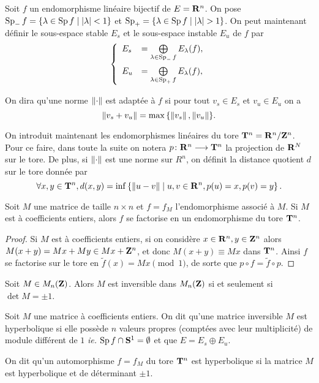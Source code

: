   Soit $f$ un endomorphisme linéaire bijectif de $E = \mathbf R^n$.
  On pose $\operatorname{Sp}_{-}f = \{\lambda \in \operatorname{Sp} f \mid |\lambda| < 1\}$ et $\operatorname{Sp}_{+} = \{\lambda \in \operatorname{Sp}{f} \mid |\lambda| > 1\}$.
  On peut maintenant définir le sous-espace stable $E_s$ et le sous-espace instable $E_u$ de $f$ par
  $$\left\{\begin{array}{ll}
    E_s &= \bigoplus\limits_{\lambda \in \Spe_-{f}} E_{\lambda}(f),\vspace{0.5em} \\
    E_u &= \bigoplus\limits_{\lambda \in \Spe_+{f}} E_{\lambda}(f), \\
  \end{array}\right.$$

  On dira qu'une norme $\left\lVert \cdot\right\rVert$ est adaptée à $f$ si pour tout $v_s \in E_s$ et $v_u \in E_u$ on a
  $$\left\lVert v_s + v_u\right\rVert = \max{\{\left\lVert v_s\right\rVert, \left\lVert v_u\right\rVert\}}.$$

  On introduit maintenant les endomorphismes linéaires du tore $\mathbf T^n = \mathbf R^n / \mathbf Z^n$. Pour ce faire,
  dans toute la suite on notera $p \colon \mathbf R^n \longrightarrow \mathbf T^n$ la projection de $\mathbf R^N$ sur le tore.
  De plus, si $\left\lVert \cdot\right\rVert$ est une norme sur $R^n$, on définit la distance quotient $d$ sur le tore donnée par
  $$\forall x, y \in \mathbf T^n, d(x, y) = \inf\left\{\left\lVert u -v\right\rVert \mid u, v \in \mathbf R^n, p(u) = x, p(v) = y\right\}.$$

  \begin{proposition}
    Soit $M$ une matrice de taille $n\times n$ et $f = f_M$ l'endomorphisme associé à $M$.
    Si $M$ est à coefficients entiers, alors $f$ se factorise en un endomorphisme du tore $\mathbf T^n$.
  \end{proposition}

  \begin{proof}
    Si $M$ est à coefficients entiers, si on considère $x \in \mathbf R^n, y \in \mathbf Z^n$ alors $M(x + y) = Mx + My \in Mx + \mathbf Z^n$,
    et donc $M(x + y) \equiv Mx$ dans $\mathbf T^n$. Ainsi $f$ se factorise sur le tore en $\tilde{f}(x) = Mx \pmod 1$,
    de sorte que $p \circ f = \tilde f \circ p$.
  \end{proof}

  \begin{proposition}
    Soit $M \in M_n(\mathbf Z)$. Alors $M$ est inversible dans $M_n(\mathbf Z)$ si et seulement si $\det M = \pm 1$.
  \end{proposition}

  \begin{definition}
    Soit $M$ une matrice à coefficients entiers.
    On dit qu'une matrice inversible $M$ est hyperbolique si elle possède $n$ valeurs propres (comptées avec leur multiplicité)
    de module différent de $1$ \textit{ie.} $\operatorname{Sp}{f} \cap \mathbf S^1 = \emptyset$ et que $E = E_s \oplus E_u$.

    On dit qu'un automorphisme $f = f_M$ du tore $\mathbf T^n$ est hyperbolique si la matrice $M$ est hyperbolique et de déterminant $\pm 1$.
  \end{definition}


